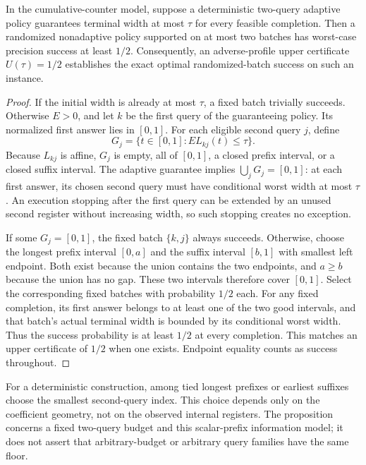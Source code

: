 \begin{proposition}
\label{prop:counter-half-floor}
In the cumulative-counter model, suppose a deterministic two-query
adaptive policy guarantees terminal width at most $\tau$ for every
feasible completion. Then a randomized nonadaptive policy supported on
at most two batches has worst-case precision success at least $1/2$.
Consequently, an adverse-profile upper certificate $U(\tau)=1/2$
establishes the exact optimal randomized-batch success on such an instance.
\end{proposition}
\begin{proof}
If the initial width is already at most $\tau$, a fixed batch trivially
succeeds. Otherwise $E>0$, and let $k$ be the first query of the
guaranteeing policy. Its normalized first answer lies in
$[0,1]$. For each eligible second query $j$, define
\[
 G_j=\{t\in[0,1]:EL_{kj}(t)\leq\tau\}.
\]
Because $L_{kj}$ is affine, $G_j$ is empty, all of $[0,1]$, a closed
prefix interval, or a closed suffix interval. The adaptive guarantee
implies $\bigcup_jG_j=[0,1]$: at each first answer, its chosen second
query must have conditional worst width at most $\tau$.
An execution stopping after the first query can be extended by an unused
second register without increasing width, so such stopping creates no exception.

If some $G_j=[0,1]$, the fixed batch $\{k,j\}$ always succeeds.
Otherwise, choose the longest prefix interval $[0,a]$ and the suffix
interval $[b,1]$ with smallest left endpoint. Both exist because the
union contains the two endpoints, and $a\geq b$ because the union has
no gap. These two intervals therefore cover $[0,1]$.
Select the corresponding fixed batches with probability $1/2$ each.
For any fixed completion, its first answer belongs to at least one of
the two good intervals, and that batch's actual terminal width is bounded
by its conditional worst width. Thus the success probability is at least
$1/2$ at every completion. This matches an upper certificate of $1/2$
when one exists. Endpoint equality counts as success throughout.
\end{proof}

For a deterministic construction, among tied longest prefixes or earliest
suffixes choose the smallest second-query index. This choice depends only
on the coefficient geometry, not on the observed internal registers.
The proposition concerns a fixed two-query budget and this scalar-prefix
information model; it does not assert that arbitrary-budget or arbitrary
query families have the same floor.
